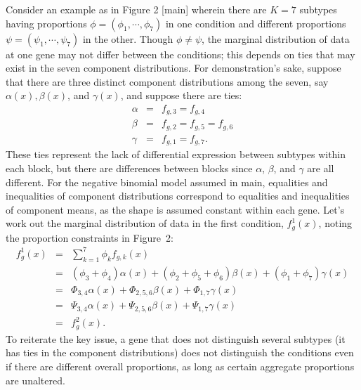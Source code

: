 \documentclass[aoas,preprint]{imsart}
\begin{document}
{Consider an example as in Figure 2 [main] wherein there are $K=7$ subtypes having 
proportions $\phi=(\phi_1, \cdots, \phi_7)$ in one condition and different proportions 
$\psi = (\psi_1, \cdots, \psi_7)$ in the other.  Though $\phi \neq \psi$, the marginal
distribution of data at one gene may not differ between the conditions; this depends on
ties that may exist in the seven component distributions.  For demonstration's sake, suppose
that there are three distinct component distributions among the seven, say $\alpha(x), \beta(x)$,
and $\gamma(x)$, and suppose there are ties:
\begin{eqnarray*}
\alpha &=& f_{g,3} = f_{g,4} \\
\beta  &=& f_{g,2}= f_{g,5} = f_{g,6} \\
\gamma &=& f_{g,1} = f_{g,7}. 
\end{eqnarray*}
These ties represent the lack of differential expression between subtypes within each block, but
there are differences between blocks since $\alpha$, $\beta$, and $\gamma$ are all different. 
For the negative binomial model assumed in main, equalities and inequalities of component distributions correspond to equalities and inequalities of component means, as the shape is assumed constant 
within each gene.
 Let's work out the marginal distribution of data in the first
condition, $f^1_g(x)$, noting the proportion constraints in Figure~2:
\begin{eqnarray*}
f^1_g(x) &=& \sum_{k=1}^7 \phi_k f_{g,k} (x) \\
       &=& (\phi_3+\phi_4) \alpha(x) + (\phi_2+\phi_5+\phi_6) \beta(x) + (\phi_1+\phi_7) \gamma(x) \\
   & = & \Phi_{3,4} \alpha(x) + \Phi_{2,5,6} \beta(x) + \Phi_{1,7} \gamma(x) \\
   &=&  \Psi_{3,4} \alpha(x) + \Psi_{2,5,6} \beta(x) + \Psi_{1,7} \gamma(x) \\
   &=& f^2_g(x) .
\end{eqnarray*}
To reiterate the key issue, a gene that does not distinguish several subtypes (it has ties in
the component distributions) does not distinguish the conditions even if there are 
different overall proportions, as long as certain aggregate proportions are unaltered.}
\end{document}
